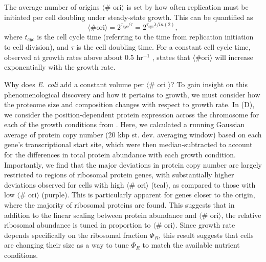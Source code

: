 The average number of origins $\langle$\# ori$\rangle$ is set by how often
replication must be initiated per cell doubling under steady-state growth.
This can be quantified as
\begin{equation}
    \langle \text{\# ori} \rangle = 2^{\tau_{cyc} / \tau} = 2^{\tau_{cyc} \lambda / ln(2)},
    \label{eq:Nori}
\end{equation}
where $t_{cyc}$ is the cell cycle time (referring to the time from replication
initiation to cell division), and $\tau$ is the cell doubling time. For a
constant cell cycle time, observed at growth rates above about 0.5 hr$^{-1}$
\citep{helmstetter1968},  states that $\langle \text{\# ori} \rangle$ will increase
exponentially with the growth rate.

Why does \textit{E. coli} add a constant volume per $\langle$\# ori $\rangle$?
To gain insight on this phenomenological discovery and how it pertains to
growth, we must consider how the proteome size and composition changes with
respect to growth rate.  In (D), we consider the
position-dependent protein expression across the chromosome for each of the
growth conditions from \cite{schmidt2016}. Here, we calculated a running
Gaussian average of protein copy number (20 kbp st. dev. averaging window) based on each gene's transcriptional start site, which were then
median-subtracted to account for the differences in total protein abundance with each
growth condition. Importantly, we find that the major deviations in protein copy
number are largely restricted to regions of ribosomal protein genes, with
substantially higher deviations observed for cells with high $\langle$\#
ori$\rangle$ (teal), as compared to those with low $\langle$\# ori$\rangle$
(purple). This is particularly apparent for genes closer to the origin, where
the majority of ribosomal proteins are found. This suggests that in addition
to the linear scaling between protein abundance and $\langle$\# ori$\rangle$,
the relative ribosomal abundance is tuned in proportion to
$\langle$\# ori$\rangle$. Since growth rate depends specifically on the
ribosomal fraction $\Phi_R$, this result suggests that cells are changing their
size as a way to tune $\Phi_R$ to match the available nutrient conditions.



